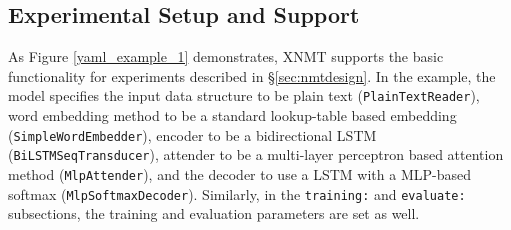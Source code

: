 \documentclass[]{article}
\begin{document}
\subsection{Experimental Setup and Support}

As Figure \ref{yaml_example_1} demonstrates, XNMT supports the basic functionality for experiments described in \S\ref{sec:nmtdesign}.
In the example, the model specifies the input data structure to be plain text (\texttt{PlainTextReader}), word embedding method to be a standard lookup-table based embedding (\texttt{SimpleWordEmbedder}), encoder to be a bidirectional LSTM (\texttt{BiLSTMSeqTransducer}), attender to be a multi-layer perceptron based attention method (\texttt{MlpAttender}), and the decoder to use a LSTM with a MLP-based softmax (\texttt{MlpSoftmaxDecoder}).
Similarly, in the \texttt{training:} and \texttt{evaluate:} subsections, the training and evaluation parameters are set as well.
\end{document}

